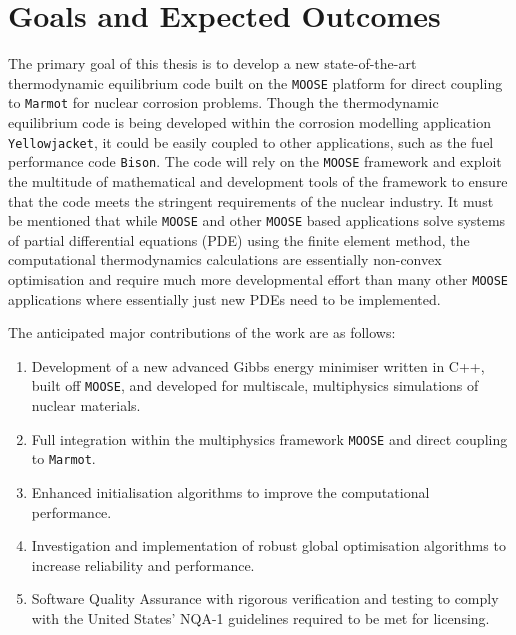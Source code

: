 \section*{Goals and Expected Outcomes}
The primary goal of this thesis is to develop a new state-of-the-art thermodynamic equilibrium code built on the \texttt{MOOSE} platform for direct coupling to \texttt{Marmot} for nuclear corrosion problems. Though the thermodynamic equilibrium code is being developed within the corrosion modelling application \texttt{Yellowjacket}, it could be easily coupled to other applications, such as the fuel performance code \texttt{Bison}. The code will rely on the \texttt{MOOSE} framework and exploit the multitude of mathematical and development tools of the framework to ensure that the code meets the stringent requirements of the nuclear industry. It must be mentioned that while \texttt{MOOSE} and other \texttt{MOOSE} based applications solve systems of partial differential equations (PDE) using the finite element method, the computational thermodynamics calculations are essentially  non-convex optimisation and require much more developmental effort than many other \texttt{MOOSE} applications where essentially just new PDEs need to be implemented.
	
	The anticipated major contributions of the work are as follows:
	\begin{enumerate}\compresslist
		\item Development of a new advanced Gibbs energy minimiser written in C++, built off \texttt{MOOSE}, and developed for multiscale, multiphysics simulations of nuclear materials.
		\item Full integration within the multiphysics framework \texttt{MOOSE} and direct coupling to 	\texttt{Marmot}.
		\item Enhanced initialisation algorithms to improve the computational performance.
		\item Investigation and implementation of robust global optimisation algorithms to increase reliability and performance.
		\item Software Quality Assurance with rigorous verification and testing to comply with the United States' NQA-1 guidelines required to be met for licensing.
	\end{enumerate}
	

